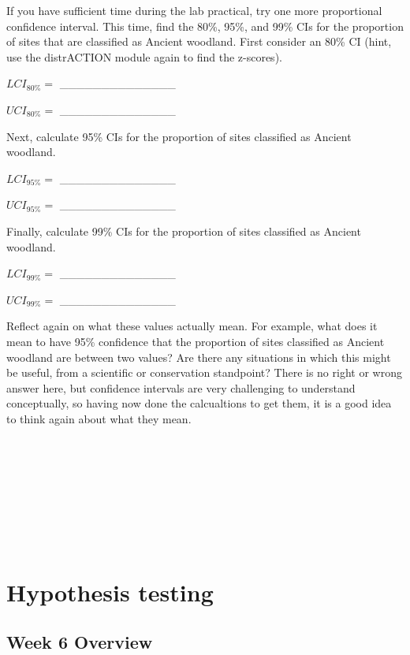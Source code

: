 \documentclass[
]{scrbook}
\begin{document}
If you have sufficient time during the lab practical, try one more proportional confidence interval.
This time, find the 80\%, 95\%, and 99\% CIs for the proportion of sites that are classified as Ancient woodland.
First consider an 80\% CI (hint, use the distrACTION module again to find the z-scores).

\(LCI_{80\%} =\) \_\_\_\_\_\_\_\_\_\_\_\_\_\_

\(UCI_{80\%} =\) \_\_\_\_\_\_\_\_\_\_\_\_\_\_

Next, calculate 95\% CIs for the proportion of sites classified as Ancient woodland.

\(LCI_{95\%} =\) \_\_\_\_\_\_\_\_\_\_\_\_\_\_

\(UCI_{95\%} =\) \_\_\_\_\_\_\_\_\_\_\_\_\_\_

Finally, calculate 99\% CIs for the proportion of sites classified as Ancient woodland.

\(LCI_{99\%} =\) \_\_\_\_\_\_\_\_\_\_\_\_\_\_

\(UCI_{99\%} =\) \_\_\_\_\_\_\_\_\_\_\_\_\_\_

Reflect again on what these values actually mean.
For example, what does it mean to have 95\% confidence that the proportion of sites classified as Ancient woodland are between two values?
Are there any situations in which this might be useful, from a scientific or conservation standpoint?
There is no right or wrong answer here, but confidence intervals are very challenging to understand conceptually, so having now done the calcualtions to get them, it is a good idea to think again about what they mean.

\begin{verbatim}








\end{verbatim}

\hypertarget{part-hypothesis-testing}{%
\part{Hypothesis testing}\label{part-hypothesis-testing}}

\hypertarget{Week6}{%
\chapter*{Week 6 Overview}\label{Week6}}
\end{document}
